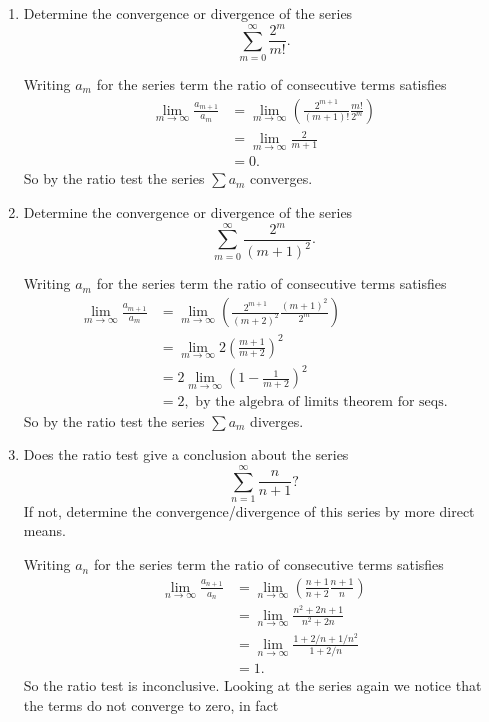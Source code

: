 \documentclass[oneside,10pt]{memoir}
\newcounter{pass}
\begin{document}
{
\begin{enumerate}
\setcounter{enumi}{\value{pass}}
\item
Determine the convergence or divergence of the series
$$\sum_{m=0}^\infty \frac{2^m}{m!}.$$
\begin{solution}Writing $a_m$ for the series term the ratio of consecutive terms satisfies
\begin{align*}
\lim_{m \to \infty} \frac{a_{m+1}}{a_m} & = \lim_{m \to \infty} \left ( \frac{2^{m+1}}{(m+1)!} \frac{m!}{2^m} \right ) \\
&= \lim_{m \to \infty} \frac{2}{m+1} \\
& = 0.
\end{align*}
So by the ratio test the series $\sum a_m$ converges.
\end{solution}
\item
Determine the convergence or divergence of the series
$$\sum_{m=0}^\infty \frac{2^m}{(m+1)^2}.$$
\begin{solution}Writing $a_m$ for the series term the ratio of consecutive terms satisfies
\begin{align*}
\lim_{m \to \infty} \frac{a_{m+1}}{a_m} & = \lim_{m \to \infty} \left ( \frac{2^{m+1}}{(m+2)^2} \frac{(m+1)^2}{2^m} \right ) \\
&= \lim_{m \to \infty} 2 \left ( \frac{m+1}{m+2} \right )^2\\
& = 2\lim_{m \to \infty} \left (1 -  \frac{1}{m+2} \right )^2\\
& = 2, \text{ by the algebra of limits theorem for seqs.}
\end{align*}
So by the ratio test the series $\sum a_m$ diverges.
\end{solution}
\item
Does the ratio test give a conclusion about the series
$$\sum_{n=1}^\infty \frac{n}{n+1}?$$
If not, determine the convergence/divergence of this series by more direct means.
\begin{solution}Writing $a_n$ for the series term the ratio of consecutive terms satisfies
\begin{align*}
\lim_{n \to \infty} \frac{a_{n+1}}{a_n} & = \lim_{n \to \infty} \left ( \frac{n+1}{n+2} \frac{n+1}{n} \right ) \\
&= \lim_{n \to \infty} \frac{n^2 + 2n + 1}{n^2 + 2n}\\
&= \lim_{n \to \infty} \frac{1 + 2/n + 1/n^2}{1 + 2/n}\\
& = 1.
\end{align*}
So the ratio test is inconclusive. Looking at the series again we notice that the terms do not converge to zero, in fact

\end{solution}
\end{enumerate}}
\end{document}
